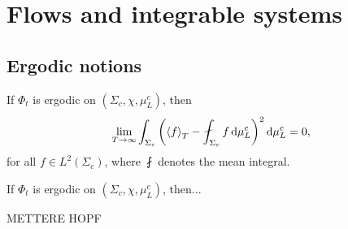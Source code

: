
\chapter{Flows and integrable systems} %

\label{AppendixC} %
\thispagestyle{empty}

\section{Ergodic notions}




\begin{nteo}
\label{teo:weak_birhoff_theorem}
If $\Phi_{t}$ is ergodic on $(\Sigma_{c},\chi,\mu_{L}^{c})$, then
\[
\lim_{T\to\infty}\int_{\Sigma_{c}}\left(\spn{f}_{T}-\fint_{\Sigma_{c}}f\dd\mu_{L}^{c}\right)^{2}\dd\mu_{L}^{c}=0,
\]
for all $f\in L^{2}(\Sigma_{c})$, where $\fint$ denotes the mean integral.
\end{nteo}



\begin{nteo}
\label{nteo:weak_birhoff_theorem}
If $\Phi_{t}$ is ergodic on $(\Sigma_{c},\chi,\mu_{L}^{c})$, then...
\end{nteo}

METTERE HOPF 